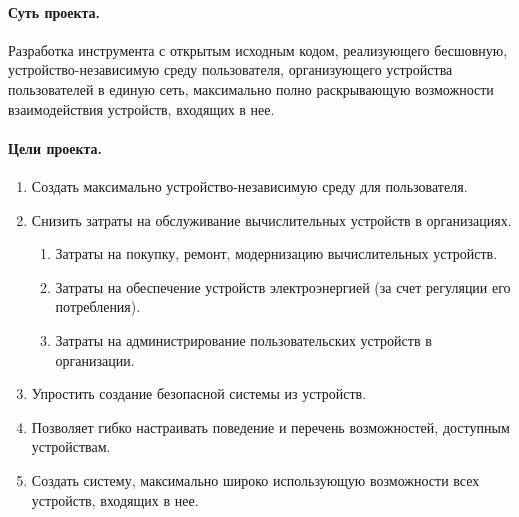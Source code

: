 \paragraph{Суть проекта.}
Разработка инструмента с открытым исходным кодом, реализующего бесшовную, устройство-независимую среду пользователя, организующего устройства пользователей в единую сеть, максимально полно раскрывающую возможности взаимодействия устройств, входящих в нее.

\paragraph{Цели проекта.}
\begin{enumerate}[nosep]
   \item Создать максимально устройство-независимую среду для пользователя.
   \item Снизить затраты на обслуживание вычислительных устройств в организациях.
         \begin{enumerate}[nosep,label*={\arabic*.}]
            \item Затраты на покупку, ремонт, модернизацию вычислительных устройств.
            \item Затраты на обеспечение устройств электроэнергией (за счет регуляции его потребления).
            \item Затраты на администрирование пользовательских устройств в организации.
         \end{enumerate}
   \item Упростить создание безопасной системы из устройств.
   \item Позволяет гибко настраивать поведение и перечень возможностей, доступным устройствам.
   \item Создать систему, максимально широко использующую возможности всех устройств, входящих в нее.
\end{enumerate}
